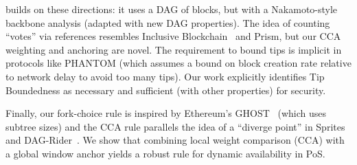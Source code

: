 {\Proj builds on these directions: it uses a DAG of blocks, but with a Nakamoto-style backbone analysis (adapted with new DAG properties). The idea of counting ``votes'' via references resembles Inclusive Blockchain~\cite{EC:Gramoli20} and Prism, but our CCA weighting and anchoring are novel. The requirement to bound tips is implicit in protocols like PHANTOM (which assumes a bound on block creation rate relative to network delay to avoid too many tips). Our work explicitly identifies Tip Boundedness as necessary and sufficient (with other properties) for security.

Finally, our fork-choice rule is inspired by Ethereum's GHOST~\cite{GHOST} (which uses subtree sizes) and the CCA rule parallels the idea of a ``diverge point'' in Sprites and DAG-Rider~\cite{DAGRider}. We show that combining local weight comparison (CCA) with a global window anchor yields a robust rule for dynamic availability in PoS.

}%
